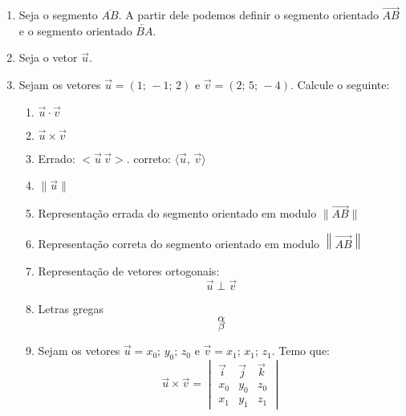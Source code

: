 \documentclass[a4paper,12pt]{article}
\begin{document}
   \begin{enumerate}
      \item Seja o segmento $\overline{AB}$. A partir dele podemos definir o segmento orientado $\overrightarrow{AB}$  e o segmento orientado $\overleftarrow{BA}$.
      \item Seja o vetor $\vec{u}$.
      \item Sejam os vetores $\vec{u}=(1;\,-1;\,2) \text{ e } \vec{v} = (2;\,5;\, -4)$.
      Calcule o seguinte:
      \begin{enumerate}
         \item $\vec{u} \cdot \vec{v}$
         \item $\vec{u} \times \vec{v}$
         \item Errado: $<\vec{u}\,\vec{v}>$. correto: $\langle\vec{u},\,\vec{v}\rangle$
         \item $\|\vec{u}\|$
         \item Representação errada do segmento orientado em modulo $\|\overrightarrow{AB}\|$
         \item Representação correta do segmento orientado em modulo $\left\|\overrightarrow{AB}\right\|$
         \item Representação de vetores ortogonais: $$\vec{u} \perp \vec{v}$$
         \item Letras gregas $$\alpha$$ $$\beta$$
         \item Sejam os vetores $\vec{u} = {x_0;\, y_0;\, z_0}$ e $\vec{v}={x_1;\, x_1;\, z_1}$. Temo que:$$
         \vec{u} \times \vec{v} = \begin{vmatrix}
         \vec{i} & \vec{j} & \vec{k}\\ x_0 & y_0 & z_0 \\ x_1 & y_1 & z_1
         \end{vmatrix}$$
         
      \end{enumerate}
   \end{enumerate}
\end{document}
